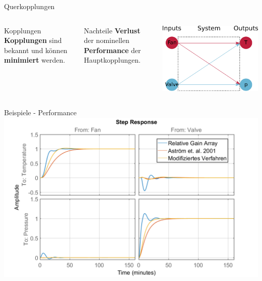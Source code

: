 \documentclass[fleqn,11pt,aspectratio=43]{beamer}
\begin{document}
\begin{frame}{Querkopplungen}
\begin{columns}[onlytextwidth]
	\begin{exampleblock}{Kopplungen}
		\textbf{Kopplungen} sind bekannt und können \textbf{minimiert} werden.
	\end{exampleblock}
	\begin{alertblock}{Nachteile}
		\textbf{Verlust} der nominellen \textbf{Performance} der Hauptkopplungen.
	\end{alertblock}
	\centering
\includegraphics[width = \textwidth]{Querkopplungen}
  \end{columns}
\end{frame}

\begin{frame}{Beispiele - Performance}
\centering
\includegraphics[width=\textwidth]{Stepresponse}
\end{frame}
\end{document}
